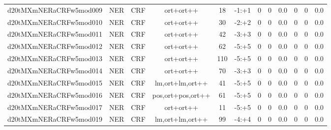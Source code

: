 \documentclass[a4paper]{article}
\begin{document}
\begin{landscape}
\begin{center}
\begin{tabular}{ |c|c|c|c|c|c|c|c|c|c|c|c|}
 
 	
 	\small{ d20tMXmNERaCRFw5mod009 } & \small{ NER} & \small{  CRF }  & ort+ort++  &  18 &  \small{  -1:+1 }  &  0 & 0 & 0.0  &  0 & 0 & 0.0 \\
 	

 
 	
 	\small{ d20tMXmNERaCRFw5mod010 } & \small{ NER} & \small{  CRF }  & ort+ort++  &  30 &  \small{  -2:+2 }  &  0 & 0 & 0.0  &  0 & 0 & 0.0 \\
 	

 
 	
 	\small{ d20tMXmNERaCRFw5mod011 } & \small{ NER} & \small{  CRF }  & ort+ort++  &  42 &  \small{  -3:+3 }  &  0 & 0 & 0.0  &  0 & 0 & 0.0 \\
 	

 
 	
 	\small{ d20tMXmNERaCRFw5mod012 } & \small{ NER} & \small{  CRF }  & ort+ort++  &  62 &  \small{  -5:+5 }  &  0 & 0 & 0.0  &  0 & 0 & 0.0 \\
 	

 
 	
 	\small{ d20tMXmNERaCRFw5mod013 } & \small{ NER} & \small{  CRF }  & ort+ort++  &  110 &  \small{  -5:+5 }  &  0 & 0 & 0.0  &  0 & 0 & 0.0 \\
 	

 
 	
 	\small{ d20tMXmNERaCRFw5mod014 } & \small{ NER} & \small{  CRF }  & ort+ort++  &  70 &  \small{  -3:+3 }  &  0 & 0 & 0.0  &  0 & 0 & 0.0 \\
 	

 
 	
 	\small{ d20tMXmNERaCRFw5mod015 } & \small{ NER} & \small{  CRF }  & lm,ort+lm,ort++  &  41 &  \small{  -5:+5 }  &  0 & 0 & 0.0  &  0 & 0 & 0.0 \\
 	

 
 	
 	\small{ d20tMXmNERaCRFw5mod016 } & \small{ NER} & \small{  CRF }  & pos,ort+pos,ort++  &  61 &  \small{  -5:+5 }  &  0 & 0 & 0.0  &  0 & 0 & 0.0 \\
 	

 
 	
 	\small{ d20tMXmNERaCRFw5mod017 } & \small{ NER} & \small{  CRF }  & ort+ort++  &  11 &  \small{  -5:+5 }  &  0 & 0 & 0.0  &  0 & 0 & 0.0 \\
 	

 
 	
 	\small{ d20tMXmNERaCRFw5mod019 } & \small{ NER} & \small{  CRF }  & lm,ort+lm,ort++  &  99 &  \small{  -4:+4 }  &  0 & 0 & 0.0  &  0 & 0 & 0.0 \\
 	


\end{tabular}
\end{center}
\end{landscape}
\end{document}
